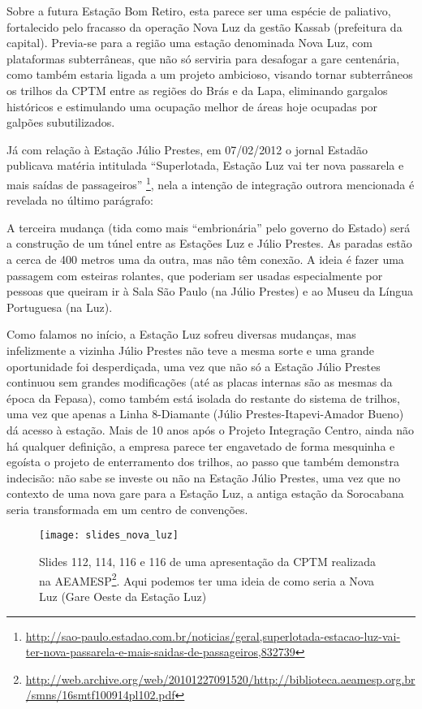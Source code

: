 \documentclass[11pt,fleqn]{book} %
\begin{document}
Sobre a futura Estação Bom Retiro, esta parece ser uma espécie de paliativo, fortalecido pelo fracasso da operação Nova Luz da gestão Kassab (prefeitura da capital). Previa-se para a região uma estação denominada Nova Luz, com plataformas subterrâneas, que não só serviria para desafogar a gare centenária, como também estaria ligada a um projeto ambicioso, visando tornar subterrâneos os trilhos da CPTM entre as regiões do Brás e da Lapa, eliminando gargalos históricos e estimulando uma ocupação melhor de áreas hoje ocupadas por galpões subutilizados.

Já com relação à Estação Júlio Prestes, em 07/02/2012 o jornal Estadão publicava matéria intitulada ``Superlotada, Estação Luz vai ter nova passarela e mais saídas de passageiros'' \footnote{\url{http://sao-paulo.estadao.com.br/noticias/geral,superlotada-estacao-luz-vai-ter-nova-passarela-e-mais-saidas-de-passageiros,832739}}, nela a intenção de integração outrora mencionada é revelada no último parágrafo:

\begin{citacao}
	A terceira mudança (tida como mais “embrionária” pelo governo do Estado) será a construção de um túnel entre as Estações Luz e Júlio Prestes. As paradas estão a cerca de 400 metros uma da outra, mas não têm conexão. A ideia é fazer uma passagem com esteiras rolantes, que poderiam ser usadas especialmente por pessoas que queiram ir à Sala São Paulo (na Júlio Prestes) e ao Museu da Língua Portuguesa (na Luz).
\end{citacao}

Como falamos no início, a Estação Luz sofreu diversas mudanças, mas infelizmente a vizinha Júlio Prestes não teve a mesma sorte e uma grande oportunidade foi desperdiçada, uma vez que não só a Estação Júlio Prestes continuou sem grandes modificações (até as placas internas são as mesmas da época da Fepasa), como também está isolada do restante do sistema de trilhos, uma vez que apenas a Linha 8-Diamante (Júlio Prestes-Itapevi-Amador Bueno) dá acesso à estação. Mais de 10 anos após o Projeto Integração Centro, ainda não há qualquer definição, a empresa parece ter engavetado de forma mesquinha e egoísta o projeto de enterramento dos trilhos, ao passo que também demonstra indecisão: não sabe se investe ou não na Estação Júlio Prestes, uma vez que no contexto de uma nova gare para a Estação Luz, a antiga estação da Sorocabana seria transformada em um centro de convenções.

\begin{figure}[htb]
	\centering
	\texttt{[image: slides\_nova\_luz]}
	\caption[Nova Luz conforme slides da CPTM para a AEAMESP]{Slides 112, 114, 116 e 116 de uma apresentação da CPTM realizada na AEAMESP\footnote{\url{http://web.archive.org/web/20101227091520/http://biblioteca.aeamesp.org.br/smns/16smtf100914pl102.pdf}}. Aqui podemos ter uma ideia de como seria a Nova Luz (Gare Oeste da Estação Luz)}
	\label{fig:slides_nova_luz}
\end{figure}
\end{document}
